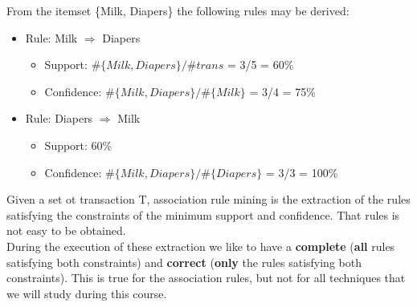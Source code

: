 \documentclass[12pt]{article}
\begin{document}
From the itemset \{Milk, Diapers\} the following rules may be derived:
\begin{itemize}
  \item Rule: Milk $\Rightarrow$ Diapers
  \begin{itemize}
    \item Support: $\#\{Milk,Diapers\}/\#trans$ = 3/5 = 60\%
    \item Confidence: $\#\{Milk,Diapers\}/\#\{Milk\}$ = 3/4 = 75\%
  \end{itemize}
  \item Rule: Diapers $\Rightarrow$ Milk
  \begin{itemize}
    \item Support: 60\%
    \item Confidence: $\#\{Milk,Diapers\}/\#\{Diapers\}$ = 3/3 = 100\%
  \end{itemize}
\end{itemize}
Given a set ot transaction T, association rule mining is the extraction of the rules satisfying the constraints of the minimum support and confidence. That rules is not easy to be obtained.\\
During the execution of these extraction we like to have a \textbf{complete} (\textbf{all} rules satisfying both constraints) and \textbf{correct} (\textbf{only} the rules satisfying both constraints). This is true for the association rules, but not for all techniques that we will study during this course.\\
\end{document}
